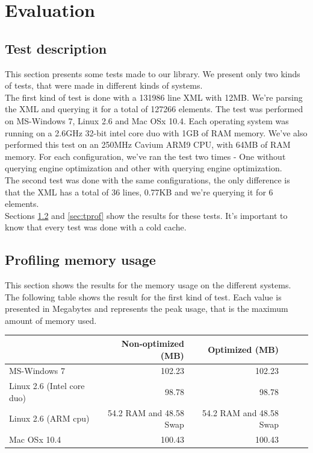 \documentclass[a4paper]{report}
\begin{document}

\chapter{Evaluation}\label{chap:eval}

\section{Test description}\label{sec:testdesc}
	This section presents some tests made to our library. We present only two kinds of tests, that were made in different kinds of systems.\\
	
	The first kind of test is done with a 131986 line XML with 12MB. We're parsing the XML and querying it for a total of 127266 elements. The test was performed on MS-Windows 7, Linux 2.6 and Mac OSx 10.4. Each 
	operating system was running on a 2.6GHz 32-bit intel core duo with 1GB of RAM memory. We've also performed this test on an 250MHz Cavium ARM9 CPU, with 64MB of RAM memory. For each configuration, we've ran 
	the test two times - One without querying engine optimization and other with querying engine optimization. \\
	
	The second test was done with the same configurations, the only difference is that the XML has a total of 36 lines, 0.77KB and we're querying it for 6 elements.\\
	
	Sections \ref{sec:mprof} and \ref{sec:tprof} show the results for these tests. It's important to know that every test was done with a cold cache.
	
\section{Profiling memory usage}\label{sec:mprof}
	This section shows the results for the memory usage on the different systems. The following table shows the result for the first kind of test. Each value is presented in Megabytes and represents the peak usage, that is the 
	maximum amount of memory used.
	
	\begin{center}
  			\begin{tabular}{ | l | r | r | r | r | r | }
			    \hline
				       	       		     			 & Non-optimized (MB) & Optimized (MB)\\ \hline
				    MS-Windows 7   			&  102.23  & 102.23  \\ \hline
				    Linux 2.6 (Intel core duo) 	&  98.78  & 98.78  \\ \hline
				    Linux 2.6 (ARM cpu)   		&  54.2 RAM and 48.58 Swap  & 54.2 RAM and 48.58 Swap \\ \hline
				    Mac OSx 10.4   			&  100.43  & 100.43 \\ 
			    \hline
			\end{tabular}		   
	\end{center}
\end{document}
